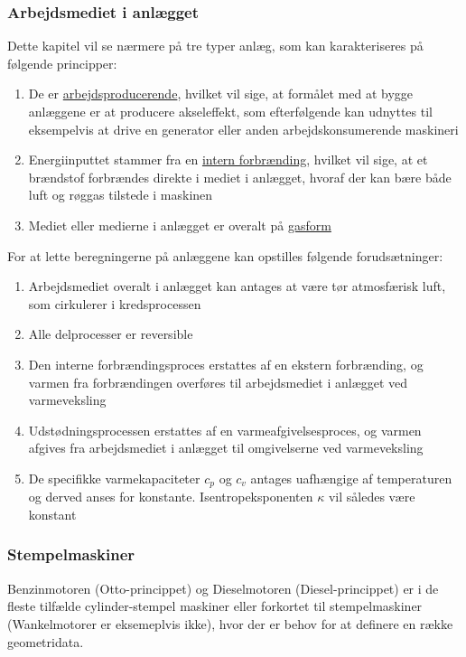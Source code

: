 \subsubsection{Arbejdsmediet i anlægget}
Dette kapitel vil se nærmere på tre typer anlæg, som kan karakteriseres på følgende principper:
\begin{enumerate}
  \item De er \underline{arbejdsproducerende}, hvilket vil sige, at formålet med at bygge anlæggene er at producere akseleffekt, som efterfølgende kan udnyttes til eksempelvis at drive en generator eller anden arbejdskonsumerende maskineri
  \item Energiinputtet stammer fra en \underline{intern forbrænding}, hvilket vil sige, at et brændstof forbrændes direkte i mediet i anlægget, hvoraf der kan bære både luft og røggas tilstede i maskinen
  \item Mediet eller medierne i anlægget er overalt på \underline{gasform}
\end{enumerate}
For at lette beregningerne på anlæggene kan opstilles følgende forudsætninger:
\begin{enumerate}
  \item Arbejdsmediet overalt i anlægget kan antages at være tør atmosfærisk luft, som cirkulerer i kredsprocessen
  \item Alle delprocesser er reversible
  \item Den interne forbrændingsproces erstattes af en ekstern forbrænding, og varmen fra forbrændingen overføres til arbejdsmediet i anlægget ved varmeveksling
  \item Udstødningsprocessen erstattes af en varmeafgivelsesproces, og varmen afgives fra arbejdsmediet i anlægget til omgivelserne ved varmeveksling
  \item De specifikke varmekapaciteter $c_p$ og $c_v$ antages uafhængige af temperaturen og derved anses for konstante. Isentropeksponenten $\kappa$ vil således være konstant
\end{enumerate}

\subsubsection{Stempelmaskiner}
Benzinmotoren (Otto-princippet) og Dieselmotoren (Diesel-princippet) er i de fleste tilfælde cylinder-stempel maskiner eller forkortet til stempelmaskiner (Wankelmotorer er eksemeplvis ikke), hvor der er behov for at definere en række geometridata.

